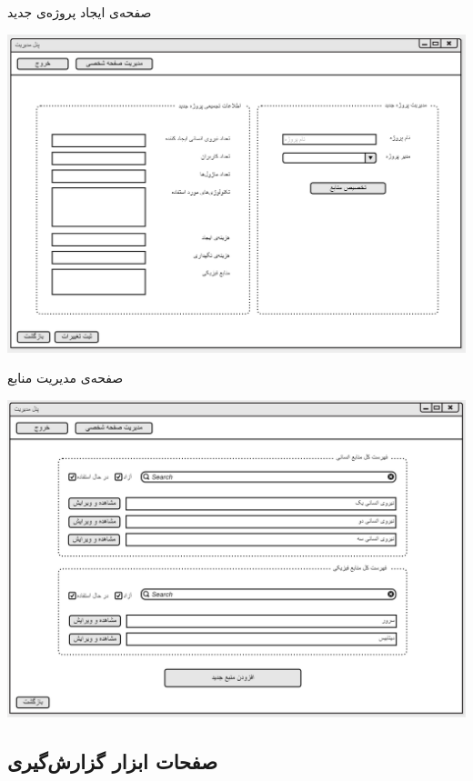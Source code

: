\vspace{1cm}
صفحه‌ی ایجاد پروژه‌ی جدید
\begin{center}
\includegraphics[width=\textwidth]{Prototype/HeadManager/CreateNewProject.png}
\end{center}

\newpage
\vspace{1cm}
صفحه‌ی مدیریت منابع 
\begin{center}
\includegraphics[width=\textwidth]{Prototype/HeadManager/ManageAllResources.png}
\end{center}

\newpage
\subsection{صفحات ابزار گزارش‌گیری}

